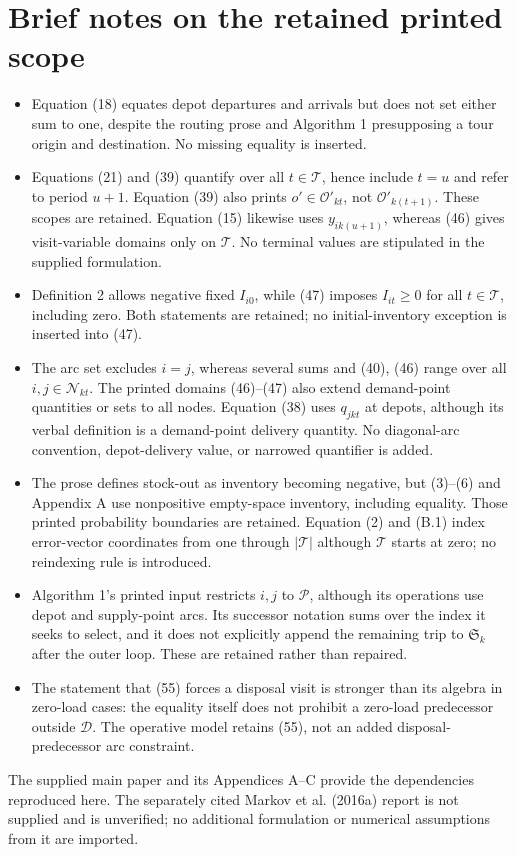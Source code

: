 \documentclass[10pt]{article}
\begin{document}
\section*{Brief notes on the retained printed scope}
\begin{itemize}
\item Equation (18) equates depot departures and arrivals but does not set either sum to one, despite the routing prose and Algorithm 1 presupposing a tour origin and destination. No missing equality is inserted.
\item Equations (21) and (39) quantify over all $t\in\mathcal T$, hence include $t=u$ and refer to period $u+1$. Equation (39) also prints $o'\in\mathcal O'_{kt}$, not $\mathcal O'_{k(t+1)}$. These scopes are retained. Equation (15) likewise uses $y_{ik(u+1)}$, whereas (46) gives visit-variable domains only on $\mathcal T$. No terminal values are stipulated in the supplied formulation.
\item Definition 2 allows negative fixed $I_{i0}$, while (47) imposes $I_{it}\geqslant0$ for all $t\in\mathcal T$, including zero. Both statements are retained; no initial-inventory exception is inserted into (47).
\item The arc set excludes $i=j$, whereas several sums and (40), (46) range over all $i,j\in\mathcal N_{kt}$. The printed domains (46)--(47) also extend demand-point quantities or sets to all nodes. Equation (38) uses $q_{jkt}$ at depots, although its verbal definition is a demand-point delivery quantity. No diagonal-arc convention, depot-delivery value, or narrowed quantifier is added.
\item The prose defines stock-out as inventory becoming negative, but (3)--(6) and Appendix A use nonpositive empty-space inventory, including equality. Those printed probability boundaries are retained. Equation (2) and (B.1) index error-vector coordinates from one through $|\mathcal T|$ although $\mathcal T$ starts at zero; no reindexing rule is introduced.
\item Algorithm 1's printed input restricts $i,j$ to $\mathcal P$, although its operations use depot and supply-point arcs. Its successor notation sums over the index it seeks to select, and it does not explicitly append the remaining trip to $\mathfrak S_k$ after the outer loop. These are retained rather than repaired.
\item The statement that (55) forces a disposal visit is stronger than its algebra in zero-load cases: the equality itself does not prohibit a zero-load predecessor outside $\mathcal D$. The operative model retains (55), not an added disposal-predecessor arc constraint.
\end{itemize}
The supplied main paper and its Appendices A--C provide the dependencies reproduced here. The separately cited Markov et al. (2016a) report is not supplied and is unverified; no additional formulation or numerical assumptions from it are imported.
\end{document}
